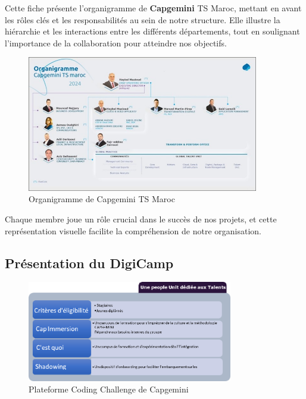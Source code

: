 \documentclass[12pt,a4paper]{report}
\begin{document}
Cette fiche présente l'organigramme de \textbf{Capgemini} TS Maroc, mettant en avant les rôles clés et les responsabilités au sein de notre structure. Elle illustre la hiérarchie et les interactions entre les différents départements, tout en soulignant l'importance de la collaboration pour atteindre nos objectifs.

\begin{figure}[htbp]
    \centering
    \includegraphics[width=0.9\textwidth]{latex_media/media/image5.jpeg}
    \caption{Organigramme de Capgemini TS Maroc}
    \label{fig:organigramme-capgemini}
\end{figure}

Chaque membre joue un rôle crucial dans le succès de nos projets, et cette représentation visuelle facilite la compréhension de notre organisation.

\subsection{Présentation du DigiCamp}

\begin{figure}[H]
\centering
\includegraphics[width=0.8\textwidth]{latex_media/media/image6.png}
\caption{Plateforme Coding Challenge de Capgemini}
\label{fig:coding-challenge-capgemini}
\end{figure}
\end{document}
